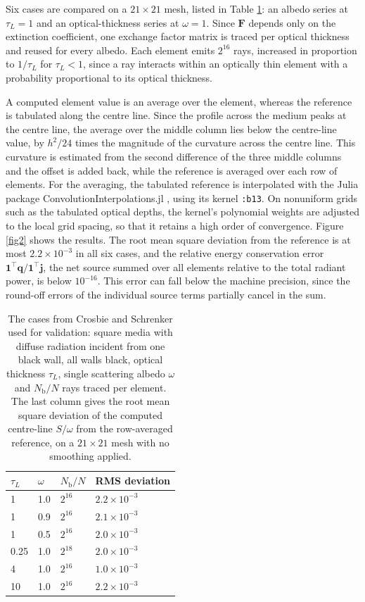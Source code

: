 \documentclass[preprint,1p,times]{elsarticle}
\theoremstyle{plain}
\theoremstyle{definition}
\theoremstyle{remark}
\begin{document}
Six cases are compared on a $21\times 21$ mesh, listed in Table \ref{tab:table1}: an albedo series at $\tau_L = 1$ and an optical-thickness series at $\omega = 1$. Since $\mathbf{F}$ depends only on the extinction coefficient, one exchange factor matrix is traced per optical thickness and reused for every albedo. Each element emits $2^{16}$ rays, increased in proportion to $1/\tau_L$ for $\tau_L < 1$, since a ray interacts within an optically thin element with a probability proportional to its optical thickness. 

A computed element value is an average over the element, whereas the reference is tabulated along the centre line. Since the profile across the medium peaks at the centre line, the average over the middle column lies below the centre-line value, by $h^2/24$ times the magnitude of the curvature across the centre line. This curvature is estimated from the second difference of the three middle columns and the offset is added back, while the reference is averaged over each row of elements. For the averaging, the tabulated reference is interpolated with the Julia package ConvolutionInterpolations.jl \citep{Bielefeld2025}, using its kernel \texttt{:b13}. On nonuniform grids such as the tabulated optical depths, the kernel's polynomial weights are adjusted to the local grid spacing, so that it retains a high order of convergence. Figure \ref{fig2} shows the results. The root mean square deviation from the reference is at most $2.2\times 10^{-3}$ in all six cases, and the relative energy conservation error $\mathbf{1}^\top\mathbf{q}/\mathbf{1}^\top\mathbf{j}$, the net source summed over all elements relative to the total radiant power, is below $10^{-16}$. This error can fall below the machine precision, since the round-off errors of the individual source terms partially cancel in the sum.

\begin{table} [ht]
\centering
\caption{The cases from Crosbie and Schrenker \citep{Crosbie1984} used for validation: square media with diffuse radiation incident from one black wall, all walls black, optical thickness $\tau_L$, single scattering albedo $\omega$ and $N_\mathrm{b}/N$ rays traced per element. The last column gives the root mean square deviation of the computed centre-line $S/\omega$ from the row-averaged reference, on a $21\times 21$ mesh with no smoothing applied.}
\label{tab:table1}
\begin{tabular}{llll}
$\tau_L$ & $\omega$ & $N_\mathrm{b}/N$ & RMS deviation \\ \hline
1    & 1.0 & $2^{16}$ & $2.2\times 10^{-3}$ \\
1    & 0.9 & $2^{16}$ & $2.1\times 10^{-3}$ \\
1    & 0.5 & $2^{16}$ & $2.0\times 10^{-3}$ \\
0.25 & 1.0 & $2^{18}$ & $2.0\times 10^{-3}$ \\
4    & 1.0 & $2^{16}$ & $1.0\times 10^{-3}$ \\
10   & 1.0 & $2^{16}$ & $2.2\times 10^{-3}$ \\ \hline
\end{tabular}
\end{table}
\end{document}

